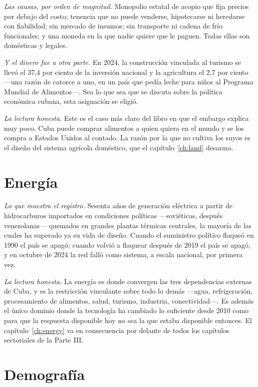 \emph{Las causas, por orden de magnitud.} Monopolio estatal de acopio que fija
precios por debajo del costo; tenencia que no puede venderse, hipotecarse ni
heredarse con fiabilidad; sin mercado de insumos; sin transporte ni cadena de frío
funcionales; y una moneda en la que nadie quiere que le paguen. Todas ellas son
domésticas y legales.

\emph{Y el dinero fue a otra parte.} En 2024, la construcción vinculada al turismo
se llevó el 37,4 por ciento de la inversión nacional y la agricultura el 2,7 por
ciento ---una razón de catorce a uno, en un país que pedía leche para niños al
Programa Mundial de Alimentos---. Sea lo que sea que se discuta sobre la política
económica cubana, esta asignación se eligió.

\emph{La lectura honesta.} Este es el caso más claro del libro en que el embargo
explica muy poco. Cuba puede comprar alimentos a quien quiera en el mundo y se los
compra a Estados Unidos al contado. La razón por la que no cultiva los suyos es el
diseño del sistema agrícola doméstico, que el capítulo~\ref{ch:land} desarma.

\section{Energía}

\emph{Lo que muestra el registro.} Sesenta años de generación eléctrica a partir de
hidrocarburos importados en condiciones políticas ---soviéticas, después
venezolanas--- quemados en grandes plantas térmicas centrales, la mayoría de las
cuales ha superado ya su vida de diseño. Cuando el suministro político flaqueó en
1990 el país se apagó; cuando volvió a flaquear después de 2019 el país se apagó, y
en octubre de 2024 la red falló como sistema, a escala nacional, por primera vez.

\emph{La lectura honesta.} La energía es donde convergen las tres dependencias
externas de Cuba, y es la restricción vinculante sobre todo lo demás ---agua,
refrigeración, procesamiento de alimentos, salud, turismo, industria,
conectividad---. Es además el único dominio donde la tecnología ha cambiado lo
suficiente desde 2010 como para que la respuesta disponible hoy no sea la que
estaba disponible entonces. El capítulo~\ref{ch:energy} va en consecuencia por
delante de todos los capítulos sectoriales de la Parte III.

\section{Demografía}

